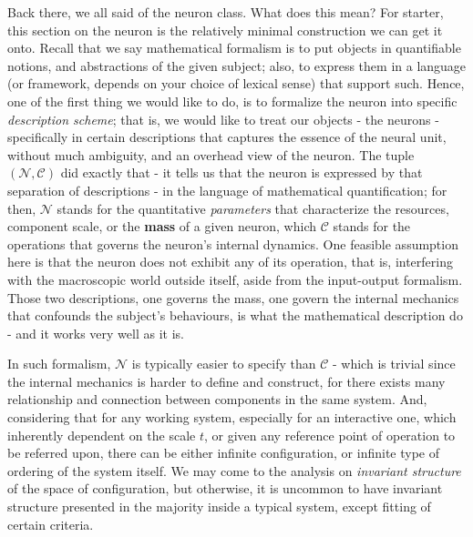 Back there, we all said of the neuron class. What does this mean? For starter, this section on the neuron is the relatively minimal construction we can get it onto. Recall that we say mathematical formalism is to put objects in quantifiable notions, and abstractions of the given subject; also, to express them in a language (or framework, depends on your choice of lexical sense) that support such. Hence, one of the first thing we would like to do, is to formalize the neuron into specific \textit{description scheme}; that is, we would like to treat our objects - the neurons - specifically in certain descriptions that captures the essence of the neural unit, without much ambiguity, and an overhead view of the neuron. The tuple $(\mathcal{N},\mathcal{C})$ did exactly that - it tells us that the neuron is expressed by that separation of descriptions - in the language of mathematical quantification; for then, $\mathcal{N}$ stands for the quantitative \textit{parameters} that characterize the resources, component scale, or the \textbf{mass} of a given neuron, which $\mathcal{C}$ stands for the operations that governs the neuron's internal dynamics. One feasible assumption here is that the neuron does not exhibit any of its operation, that is, interfering with the macroscopic world outside itself, aside from the input-output formalism. Those two descriptions, one governs the mass, one govern the internal mechanics that confounds the subject's behaviours, is what the mathematical description do - and it works very well as it is. 
\vspace{2mm}

In such formalism, $\mathcal{N}$ is typically easier to specify than $\mathcal{C}$ - which is trivial since the internal mechanics is harder to define and construct, for there exists many relationship and connection between components in the same system. And, considering that for any working system, especially for an interactive one, which inherently dependent on the scale $t$, or given any reference point of operation to be referred upon, there can be either infinite configuration, or infinite type of ordering of the system itself. We may come to the analysis on \textit{invariant structure} of the space of configuration, but otherwise, it is uncommon to have invariant structure presented in the majority inside a typical system, except fitting of certain criteria.  

